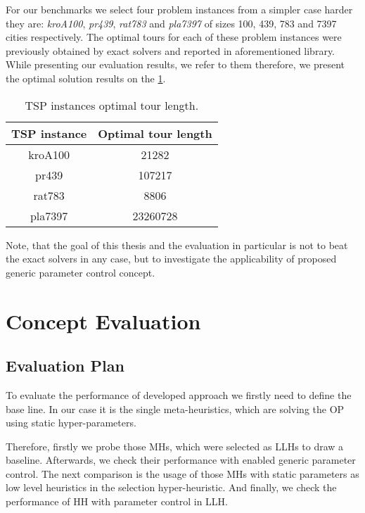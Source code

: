 For our benchmarks we select four problem instances from a simpler case harder they are: \emph{kroA100}, \emph{pr439}, \emph{rat783} and \emph{pla7397} of sizes 100, 439, 783 and 7397 cities respectively. The optimal tours for each of these problem instances were previously obtained by exact solvers and reported in aforementioned library. While presenting our evaluation results, we refer to them therefore, we present the optimal solution results on the \cref{eval:table:tsp optimal tour length}.

\begin{table}[h!]
	\centering
	\begin{tabular}{c||c}
		\textbf{TSP instance} & \textbf{Optimal tour length} \\
		\hline
		\hline
		kroA100 & 21282 \\
		pr439 & 107217 \\
		rat783 & 8806 \\
		pla7397 & 23260728 \\
	\end{tabular}
	\caption{TSP instances optimal tour length.}
	\label{eval:table:tsp optimal tour length}
\end{table}

Note, that the goal of this thesis and the evaluation in particular is not to beat the exact solvers in any case, but to investigate the applicability of proposed generic parameter control concept.


\section{Concept Evaluation}\label{eval: concept}

\subsection{Evaluation Plan}\label{eval: concept plan}
To evaluate the performance of developed approach we firstly need to define the base line. In our case it is the single meta-heuristics, which are solving the OP using static hyper-parameters. 

Therefore, firstly we probe those MHs, which were selected as LLHs to draw a baseline. Afterwards, we check their performance with enabled generic parameter control. The next comparison is the usage of those MHs with static parameters as low level heuristics in the selection hyper-heuristic. And finally, we check the performance of HH with parameter control in LLH.

